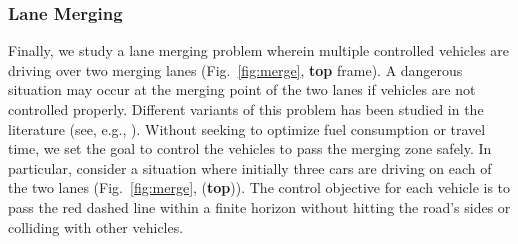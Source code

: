 %
%




\subsubsection{Lane Merging}
Finally, we study a lane merging problem wherein multiple controlled vehicles are driving over two merging lanes (Fig.~\ref{fig:merge}, \textbf{top} frame). A dangerous situation may occur at the merging point of the two lanes if vehicles are not controlled properly. Different variants of this problem has been studied in the literature (see, e.g., \cite{xiao2019merging,xiao2020merging}). Without seeking to optimize fuel consumption or travel time, we set the goal to control the vehicles to pass the merging zone safely. In particular, consider a situation where initially three cars are driving on each of the two lanes (Fig.~\ref{fig:merge}, (\textbf{top})). The control objective for each vehicle is to pass the red dashed line within a finite horizon without hitting the road's sides or colliding with other vehicles. 

